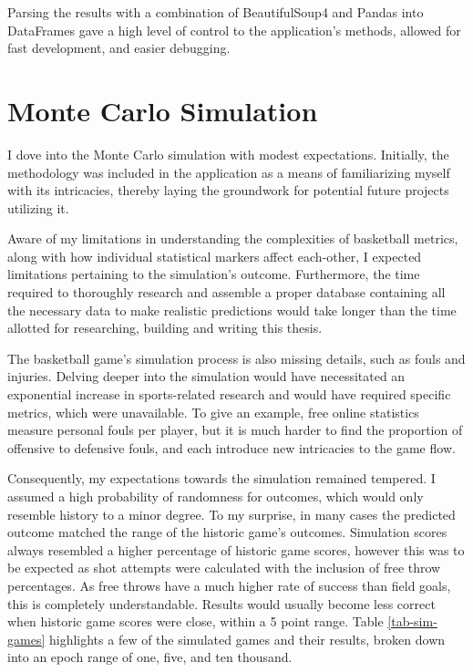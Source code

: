 \documentclass{thesis-ekf}
\theoremstyle{definition}
\theoremstyle{remark}
\begin{document}
Parsing the results with a combination of BeautifulSoup4 and Pandas into DataFrames gave a high level of control to the application's methods, allowed for fast development, and easier debugging.

\section{Monte Carlo Simulation}
I dove into the Monte Carlo simulation with modest expectations. Initially, the methodology was included in the application as a means of familiarizing myself with its intricacies, thereby laying the groundwork for potential future projects utilizing it.

Aware of my limitations in understanding the complexities of basketball metrics, along with how individual statistical markers affect each-other, I expected limitations pertaining to the simulation's outcome. Furthermore, the time required to thoroughly research and assemble a proper database containing all the necessary data to make realistic predictions would take longer than the time allotted for researching, building and writing this thesis.

The basketball game's simulation process is also missing details, such as fouls and injuries. Delving deeper into the simulation would have necessitated an exponential increase in sports-related research and would have required specific metrics, which were unavailable. To give an example, free online statistics measure personal fouls per player, but it is much harder to find the proportion of offensive to defensive fouls, and each introduce new intricacies to the game flow.

Consequently, my expectations towards the simulation remained tempered. I assumed a high probability of randomness for outcomes, which would only resemble history to a minor degree. To my surprise, in many cases the predicted outcome matched the range of the historic game's outcomes. Simulation scores always resembled a higher percentage of historic game scores, however this was to be expected as shot attempts were calculated with the inclusion of free throw percentages. As free throws have a much higher rate of success than field goals, this is completely understandable. Results would usually become less correct when historic game scores were close, within a 5 point range. Table \ref{tab-sim-games} highlights a few of the simulated games and their results, broken down into an epoch range of one, five, and ten thousand.
\end{document}
